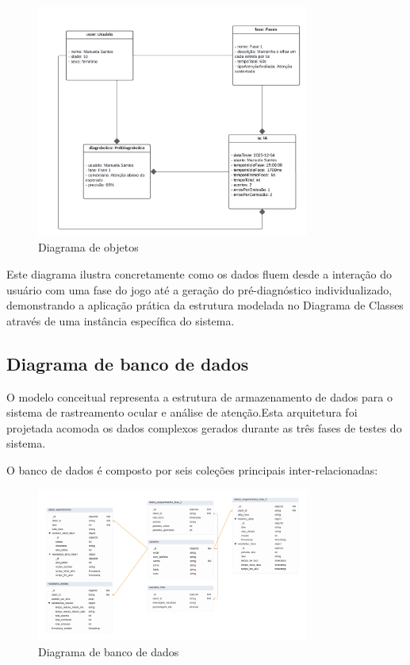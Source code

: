 \documentclass[
  a4paper,%
  12pt,%
  english,%
  brazilian,%
]{article}
\begin{document}
    \begin{figure}[H]
\centering
\caption{Diagrama de objetos}%
\label{fig:diagrama-de-objetos}
\includegraphics[width=0.8\textwidth]{Logos/diagrama-de-objetos.png}
\end{figure}

    Este diagrama ilustra concretamente como os dados fluem desde a interação do usuário com uma fase do jogo até a geração do pré-diagnóstico individualizado, demonstrando a aplicação prática da estrutura modelada no Diagrama de Classes através de uma instância específica do sistema.

    \subsection*{Diagrama de banco de dados}

    O modelo conceitual representa a estrutura de armazenamento de dados para o sistema de rastreamento ocular e análise de atenção.Esta arquitetura foi projetada acomoda os dados complexos gerados durante as três fases de testes do sistema.

    O banco de dados é composto por seis coleções principais inter-relacionadas:

    \begin{figure}[H]
\centering
\caption{Diagrama de banco de dados}%
\label{fig:diagrama-de-banco-de-dados}
\includegraphics[width=0.8\textwidth]{Logos/mongo.png}
\end{figure}
\end{document}
